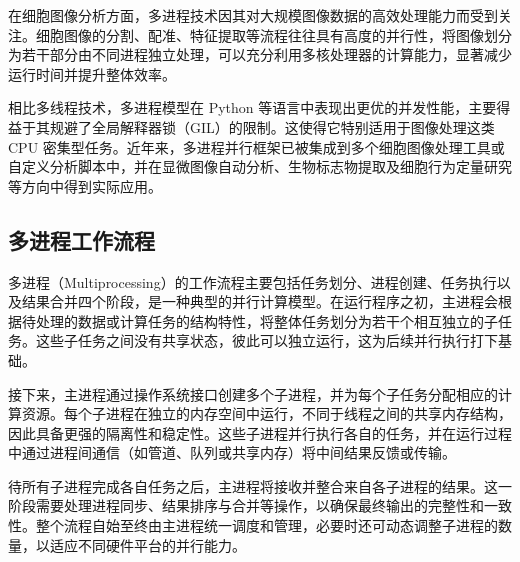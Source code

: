 在细胞图像分析方面，多进程技术因其对大规模图像数据的高效处理能力而受到关注。细胞图像的分割、配准、特征提取等流程往往具有高度的并行性，将图像划分为若干部分由不同进程独立处理，可以充分利用多核处理器的计算能力，显著减少运行时间并提升整体效率。

相比多线程技术，多进程模型在 Python 等语言中表现出更优的并发性能，主要得益于其规避了全局解释器锁（GIL）的限制。这使得它特别适用于图像处理这类 CPU 密集型任务。近年来，多进程并行框架已被集成到多个细胞图像处理工具或自定义分析脚本中，并在显微图像自动分析、生物标志物提取及细胞行为定量研究等方向中得到实际应用。
\subsection{多进程工作流程}
多进程（Multiprocessing）的工作流程主要包括任务划分、进程创建、任务执行以及结果合并四个阶段，是一种典型的并行计算模型。在运行程序之初，主进程会根据待处理的数据或计算任务的结构特性，将整体任务划分为若干个相互独立的子任务。这些子任务之间没有共享状态，彼此可以独立运行，这为后续并行执行打下基础。

接下来，主进程通过操作系统接口创建多个子进程，并为每个子任务分配相应的计算资源。每个子进程在独立的内存空间中运行，不同于线程之间的共享内存结构，因此具备更强的隔离性和稳定性。这些子进程并行执行各自的任务，并在运行过程中通过进程间通信（如管道、队列或共享内存）将中间结果反馈或传输。

待所有子进程完成各自任务之后，主进程将接收并整合来自各子进程的结果。这一阶段需要处理进程同步、结果排序与合并等操作，以确保最终输出的完整性和一致性。整个流程自始至终由主进程统一调度和管理，必要时还可动态调整子进程的数量，以适应不同硬件平台的并行能力。

